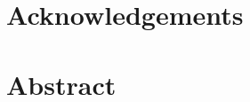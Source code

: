 \cleartorecto
\chapter*{Acknowledgements}



\cleartorecto
\chapter{Abstract}



\cleartorecto
%


%

